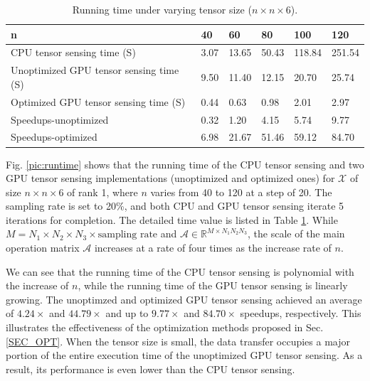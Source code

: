 \documentclass[futureinternet,article,submit,moreauthors,pdftex,10pt,a4paper]{Definitions/mdpi}
\theoremstyle{plain}
\theoremstyle{definition}
\theoremstyle{remark}
\begin{document}
\begin{table}[t]
  \renewcommand{\arraystretch}{1.3}
  \centering
  \scriptsize
  \caption{Running time under varying tensor size ($n \times n \times 6$).}
  \begin{tabular}{|l|l|l|l|l|l|}
    \hline
    \textbf{\textbf{n}} & \textbf{40}& \textbf{60}& \textbf{80} & \textbf{100} & \textbf{120}\\
    \hline
    CPU tensor sensing time (S) & 3.07 & 13.65 & 50.43 & 118.84 & 251.54\\
    \hline
    Unoptimized GPU tensor sensing time (S) & 9.50 & 11.40 & 12.15 & 20.70 & 25.74\\
    \hline
    Optimized GPU tensor sensing time (S) & 0.44 & 0.63 & 0.98 & 2.01 & 2.97\\
    \hline
    Speedups-unoptimized & 0.32 & 1.20 & 4.15 & 5.74 & 9.77\\
    \hline
    Speedups-optimized & 6.98 & 21.67 & 51.46 & 59.12 & 84.70\\
    \hline
  \end{tabular}
  \label{tbl_runtime}
\end{table}

Fig. \ref{pic:runtime} shows that the running time of the CPU tensor sensing and two GPU tensor sensing implementations (unoptimized and optimized ones) for $\mathcal{X}$ of size $n\times n \times 6$ of rank 1, where $n$ varies from 40 to 120 at a step of 20. The sampling rate is set to 20\%, and both CPU and GPU tensor sensing iterate 5 iterations for completion. The detailed time value is listed in Table \ref{tbl_runtime}. 
While $M = N_1 \times N_2 \times N_3 \times \text{sampling rate}$ and $\mathcal{A} \in \mathbb{R}^{M \times N_1N_2N_3}$, the scale of the main operation matrix $\mathcal{A}$ increases at a rate of four times as the increase rate of $n$. 

We can see that the running time of the CPU tensor sensing is polynomial with the increase of $n$, while the running time of the GPU tensor sensing is linearly growing. The unoptimzed and optimized GPU tensor sensing achieved an average of $4.24 \times$ and $44.79 \times$ and up to $9.77 \times$ and $84.70 \times$ speedups, respectively. This illustrates the effectiveness of the optimization methods proposed in Sec. \ref{SEC_OPT}. When the tensor size is small, the data transfer occupies a major portion of the entire execution time of the unoptimized GPU tensor sensing. As a result, its performance is even lower than the CPU tensor sensing.
\end{document}

